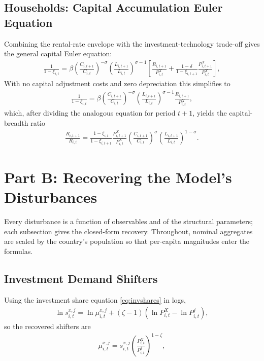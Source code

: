 \documentclass[10pt]{article}
\begin{document}
\subsection*{Households: Capital Accumulation Euler Equation}
Combining the rental-rate envelope with the investment-technology trade-off gives
the general capital Euler equation:
\begin{align}
  \frac{1}{1 - \xi_{i,t}} = \beta \left( \frac{C_{i,t+1}}{C_{i,t}} \right)^{-\sigma}
  \left( \frac{L_{i,t+1}}{L_{i,t}} \right)^{\sigma - 1}
  \left[ \frac{R_{i,t+1}}{P^{X}_{i,t}} +
  \frac{1 - \delta}{1 - \xi_{i,t+1}} \frac{P^{X}_{i,t+1}}{P^{X}_{i,t}} \right],
  \label{eq:capital-euler-gen}
\end{align}
With no capital adjustment costs and zero depreciation this simplifies to
\begin{align}
  \frac{1}{1 - \xi_{i,t}} = \beta \left( \frac{C_{i,t+1}}{C_{i,t}} \right)^{-\sigma}
  \left( \frac{L_{i,t+1}}{L_{i,t}} \right)^{\sigma - 1} \frac{R_{i,t+1}}{P^{X}_{i,t}},
  \label{eq:capital-euler}
\end{align}
which, after dividing the analogous equation for period $t+1$, yields the
capital-breadth ratio
\begin{align}
  \frac{R_{i,t+1}}{R_{i,t}} =
  \frac{1 - \xi_{i,t}}{1 - \xi_{i,t+1}} \frac{P^{X}_{i,t+1}}{P^{X}_{i,t}}
  \left( \frac{C_{i,t+1}}{C_{i,t}} \right)^{\sigma}
  \left( \frac{L_{i,t+1}}{L_{i,t}} \right)^{1 - \sigma}. \label{eq:capital-euler-ratio}
\end{align}

\section*{Part B: Recovering the Model's Disturbances}
Every disturbance is a function of observables and of the structural parameters;
each subsection gives the closed-form recovery. Throughout, nominal aggregates
are scaled by the country's population so that per-capita magnitudes enter the
formulas.

\subsection*{Investment Demand Shifters}
Using the investment share equation \eqref{eq:invshares} in logs,
\begin{align}
  \ln s^{x,j}_{i,t} = \ln \mu^{x,j}_{i,t} + \left( \zeta - 1 \right)
  \left( \ln P^{X}_{i,t} - \ln P^j_{i,t} \right), \label{eq:mux}
\end{align}
so the recovered shifters are
\begin{align}
  \mu^{x,j}_{i,t} = s^{x,j}_{i,t}
  \left( \frac{P^{X}_{i,t}}{P^j_{i,t}} \right)^{1 - \zeta}, \label{eq:PXrecover}
\end{align}
\end{document}
